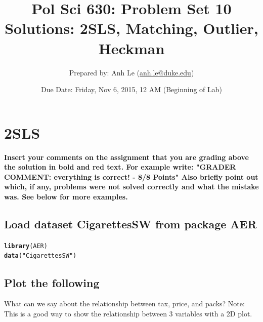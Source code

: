 \documentclass{article}\usepackage[]{graphicx}\usepackage[]{color}
\makeatletter
\newcommand{\hlstr}[1]{\textcolor[rgb]{0.192,0.494,0.8}{#1}}%
\newcommand{\hlstd}[1]{\textcolor[rgb]{0.345,0.345,0.345}{#1}}%
\newcommand{\hlkwd}[1]{\textcolor[rgb]{0.737,0.353,0.396}{\textbf{#1}}}%
\newenvironment{kframe}{%
 \def\at@end@of@kframe{}%
 \ifinner\ifhmode%
  \def\at@end@of@kframe{\end{minipage}}%
  \begin{minipage}{\columnwidth}%
 \fi\fi%
 \def\FrameCommand##1{\hskip\@totalleftmargin \hskip-\fboxsep
 \colorbox{shadecolor}{##1}\hskip-\fboxsep
     \hskip-\linewidth \hskip-\@totalleftmargin \hskip\columnwidth}%
 \MakeFramed {\advance\hsize-\width
   \@totalleftmargin\z@ \linewidth\hsize
   \@setminipage}}%
 {\par\unskip\endMakeFramed%
 \at@end@of@kframe}
\newenvironment{knitrout}{}{} %
\makeatother
\begin{document}
\title{Pol Sci 630:  Problem Set 10 Solutions: 2SLS, Matching, Outlier, Heckman}

\author{Prepared by: Anh Le (\href{mailto:anh.le@duke.edu}{anh.le@duke.edu})}

\date{Due Date: Friday, Nov 6, 2015, 12 AM (Beginning of Lab)}

\maketitle

\section{2SLS}

\textbf{\color{red} Insert your comments on the assignment that you are grading above the solution in bold and red text. For example write: "GRADER COMMENT: everything is correct! - 8/8 Points" Also briefly point out which, if any, problems were not solved correctly and what the mistake was. See below for more examples.}

\subsection{Load dataset CigarettesSW from package AER}

\begin{knitrout}
\color{fgcolor}\begin{kframe}
\begin{alltt}
\hlkwd{library}\hlstd{(AER)}
\hlkwd{data}\hlstd{(}\hlstr{"CigarettesSW"}\hlstd{)}
\end{alltt}
\end{kframe}
\end{knitrout}

\subsection{Plot the following}

What can we say about the relationship between tax, price, and packs? Note: This is a good way to show the relationship between 3 variables with a 2D plot.
\end{document}
